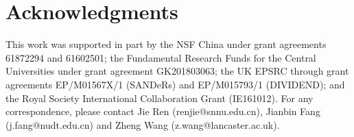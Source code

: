 \section*{Acknowledgments}
This work was supported in part by the NSF China under grant agreements 61872294 and 61602501; the Fundamental Research Funds for the
Central Universities under grant agreement GK201803063; the UK EPSRC through grant agreements EP/M01567X/1 (SANDeRs) and EP/M015793/1
(DIVIDEND); and the Royal Society International Collaboration Grant (IE161012). For any correspondence, please contact Jie Ren
(renjie@snnu.edu.cn), Jianbin Fang (j.fang@nudt.edu.cn) and Zheng Wang (z.wang@lancaster.ac.uk).
